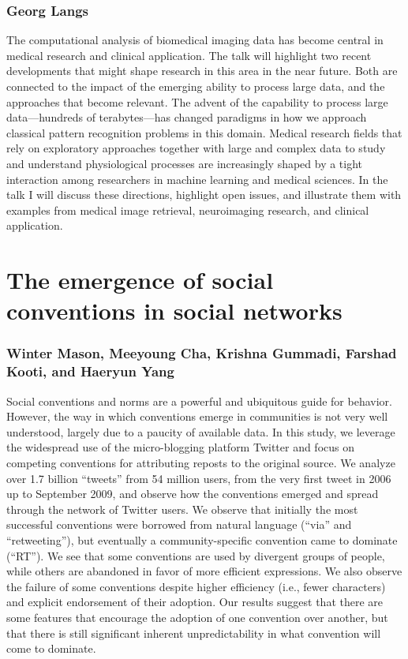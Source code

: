 \documentclass[10pt,letterpaper]{article}
\begin{document}
\subsubsection{Georg Langs}

The computational analysis of biomedical imaging data has become central in
medical research and clinical application. The talk will highlight two recent
developments that might shape research in this area in the near future. Both are
connected to the impact of the emerging ability to process large data, and the
approaches that become relevant. The advent of the capability to process large
data---hundreds of terabytes---has changed paradigms in how we approach classical
pattern recognition problems in this domain. Medical research fields that rely on
exploratory approaches together with large and complex data to study and
understand physiological processes are increasingly shaped by a tight interaction
among researchers in machine learning and medical sciences. In the talk I will
discuss these directions, highlight open issues, and illustrate them
with examples from medical image retrieval, neuroimaging research, and
clinical application.

\section{The emergence of social conventions in social networks}
\subsubsection{Winter Mason, Meeyoung Cha, Krishna Gummadi, Farshad Kooti, and Haeryun Yang}

Social conventions and norms are a powerful and ubiquitous guide for behavior.
However, the way in which conventions emerge in communities is not very well
understood, largely due to a paucity of available data.  In this study, we
leverage the widespread use of the micro-blogging platform Twitter and focus on
competing conventions for attributing reposts to the original source.  We analyze
over 1.7 billion ``tweets'' from 54 million users, from the very first tweet in
2006 up to September 2009, and observe how the conventions emerged and spread
through the network of Twitter users.  We observe that initially the most
successful conventions were borrowed from natural language (``via'' and
``retweeting''), but eventually a community-specific convention came to dominate
(``RT'').  We see that some conventions are used by divergent groups of people,
while others are abandoned in favor of more efficient expressions.  We also
observe the failure of some conventions despite higher efficiency (i.e., fewer
characters) and explicit endorsement of their adoption.  Our results suggest that
there are some features that encourage the adoption of one convention over
another, but that there is still significant inherent unpredictability in what
convention will come to dominate.
\end{document}
